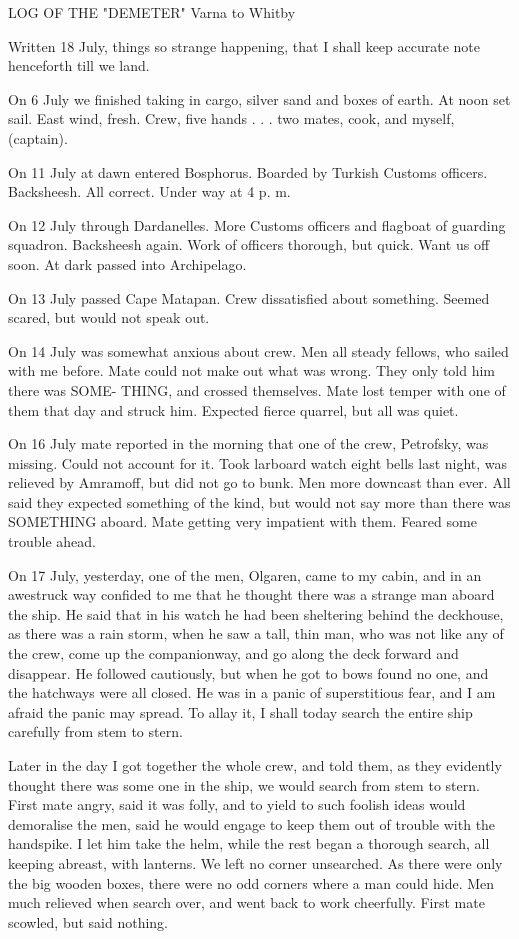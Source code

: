LOG OF THE "DEMETER" Varna to Whitby 

Written 18 July, things so strange happening, that I shall keep accurate note henceforth till we land. 

On 6 July we finished taking in cargo, silver sand and boxes of earth. At noon set sail. East wind, fresh. Crew, five hands . . . two mates, cook, and myself, (captain). 

On 11 July at dawn entered Bosphorus. Boarded by Turkish Customs officers. Backsheesh. All correct. Under way at 4 p. m. 

On 12 July through Dardanelles. More Customs officers and flagboat of guarding squadron. Backsheesh again. Work of officers thorough, but quick. Want us off soon. At dark passed into Archipelago. 

On 13 July passed Cape Matapan. Crew dissatisfied about something. Seemed scared, but would not speak out. 

On 14 July was somewhat anxious about crew. Men all steady fellows, who sailed with me before. Mate could not make out what was wrong. They only told him there was SOME- THING, and crossed themselves. Mate lost temper with one of them that day and struck him. Expected fierce quarrel, but all was quiet. 

On 16 July mate reported in the morning that one of the crew, Petrofsky, was missing. Could not account for it. Took larboard watch eight bells last night, was relieved by Amramoff, but did not go to bunk. Men more downcast than ever. All said they expected something of the kind, but would not say more than there was SOMETHING aboard. Mate getting very impatient with them. Feared some trouble ahead. 

On 17 July, yesterday, one of the men, Olgaren, came to my cabin, and in an awestruck way confided to me that he thought there was a strange man aboard the ship. He said that in his watch he had been sheltering behind the deckhouse, as there was a rain storm, when he saw a tall, thin man, who was not like any of the crew, come up the companionway, and go along the deck forward and disappear. He followed cautiously, but when he got to bows found no one, and the hatchways were all closed. He was in a panic of superstitious fear, and I am afraid the panic may spread. To allay it, I shall today search the entire ship carefully from stem to stern. 

Later in the day I got together the whole crew, and told them, as they evidently thought there was some one in the ship, we would search from stem to stern. First mate angry, said it was folly, and to yield to such foolish ideas would demoralise the men, said he would engage to keep them out of trouble with the handspike. I let him take the helm, while the rest began a thorough search, all keeping abreast, with lanterns. We left no corner unsearched. As there were only the big wooden boxes, there were no odd corners where a man could hide. Men much relieved when search over, and went back to work cheerfully. First mate scowled, but said nothing. 

